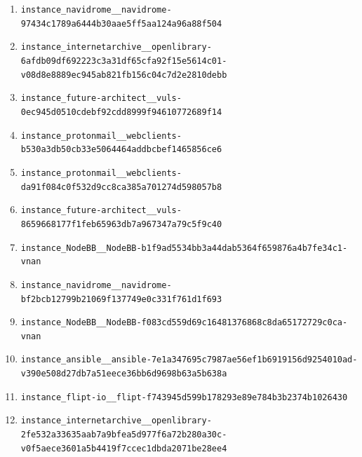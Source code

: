 \begin{enumerate}
\item \texttt{instance\_\allowbreak{}navidrome\_\allowbreak{}\_\allowbreak{}navidrome-\allowbreak{}97434c1789a644\allowbreak{}4b30aae5ff5aa1\allowbreak{}24a96a88f504}
\item \texttt{instance\_\allowbreak{}internetarchiv\allowbreak{}e\_\allowbreak{}\_\allowbreak{}openlibrary-\allowbreak{}6afdb09df69222\allowbreak{}3c3a31df65cfa9\allowbreak{}2f15e5614c01-\allowbreak{}v08d8e8889ec94\allowbreak{}5ab821fb156c04\allowbreak{}c7d2e2810debb}
\item \texttt{instance\_\allowbreak{}future-\allowbreak{}architect\_\allowbreak{}\_\allowbreak{}vuls-\allowbreak{}0ec945d0510cde\allowbreak{}bf92cdd8999f94\allowbreak{}610772689f14}
\item \texttt{instance\_\allowbreak{}protonmail\_\allowbreak{}\_\allowbreak{}webclients-\allowbreak{}b530a3db50cb33\allowbreak{}e5064464addbcb\allowbreak{}ef1465856ce6}
\item \texttt{instance\_\allowbreak{}protonmail\_\allowbreak{}\_\allowbreak{}webclients-\allowbreak{}da91f084c0f532\allowbreak{}d9cc8ca385a701\allowbreak{}274d598057b8}
\item \texttt{instance\_\allowbreak{}future-\allowbreak{}architect\_\allowbreak{}\_\allowbreak{}vuls-\allowbreak{}8659668177f1fe\allowbreak{}b65963db7a9673\allowbreak{}47a79c5f9c40}
\item \texttt{instance\_\allowbreak{}NodeBB\_\allowbreak{}\_\allowbreak{}NodeBB-\allowbreak{}b1f9ad5534bb3a\allowbreak{}44dab5364f6598\allowbreak{}76a4b7fe34c1-\allowbreak{}vnan}
\item \texttt{instance\_\allowbreak{}navidrome\_\allowbreak{}\_\allowbreak{}navidrome-\allowbreak{}bf2bcb12799b21\allowbreak{}069f137749e0c3\allowbreak{}31f761d1f693}
\item \texttt{instance\_\allowbreak{}NodeBB\_\allowbreak{}\_\allowbreak{}NodeBB-\allowbreak{}f083cd559d69c1\allowbreak{}6481376868c8da\allowbreak{}65172729c0ca-\allowbreak{}vnan}
\item \texttt{instance\_\allowbreak{}ansible\_\allowbreak{}\_\allowbreak{}ansible-\allowbreak{}7e1a347695c798\allowbreak{}7ae56ef1b69191\allowbreak{}56d9254010ad-\allowbreak{}v390e508d27db7\allowbreak{}a51eece36bb6d9\allowbreak{}698b63a5b638a}
\item \texttt{instance\_\allowbreak{}flipt-\allowbreak{}io\_\allowbreak{}\_\allowbreak{}flipt-\allowbreak{}f743945d599b17\allowbreak{}8293e89e784b3b\allowbreak{}2374b1026430}
\item \texttt{instance\_\allowbreak{}internetarchiv\allowbreak{}e\_\allowbreak{}\_\allowbreak{}openlibrary-\allowbreak{}2fe532a33635aa\allowbreak{}b7a9bfea5d977f\allowbreak{}6a72b280a30c-\allowbreak{}v0f5aece3601a5\allowbreak{}b4419f7ccec1db\allowbreak{}da2071be28ee4}

\end{enumerate}

